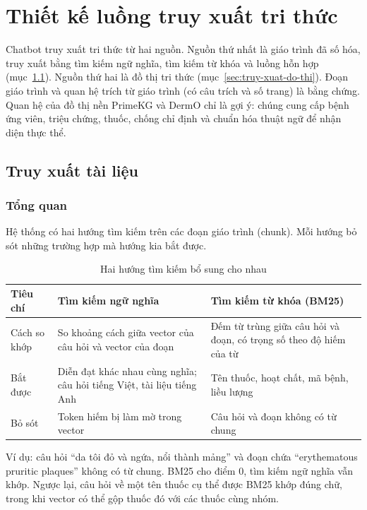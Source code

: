 \chapter[\MakeUppercase{Thiết kế luồng truy xuất tri thức}]{Thiết kế luồng truy xuất tri thức}
\label{ch:chuong3}

Chatbot truy xuất tri thức từ hai nguồn. Nguồn thứ nhất là giáo trình đã số hóa, truy xuất bằng tìm kiếm ngữ nghĩa, tìm kiếm từ khóa và luồng hỗn hợp (mục~\ref{sec:truy-xuat-tai-lieu}). Nguồn thứ hai là đồ thị tri thức (mục~\ref{sec:truy-xuat-do-thi}). Đoạn giáo trình và quan hệ trích từ giáo trình (có câu trích và số trang) là bằng chứng. Quan hệ của đồ thị nền PrimeKG và DermO chỉ là gợi ý: chúng cung cấp bệnh ứng viên, triệu chứng, thuốc, chống chỉ định và chuẩn hóa thuật ngữ để nhận diện thực thể.

\section{Truy xuất tài liệu}
\label{sec:truy-xuat-tai-lieu}

\subsection{Tổng quan}

Hệ thống có hai hướng tìm kiếm trên các đoạn giáo trình (chunk). Mỗi hướng bỏ sót những trường hợp mà hướng kia bắt được.

\begin{table}[H]
\centering
\small
\begin{tabular}{|p{3.2cm}|p{5.4cm}|p{5.4cm}|}
\hline
\textbf{Tiêu chí} & \textbf{Tìm kiếm ngữ nghĩa} & \textbf{Tìm kiếm từ khóa (BM25)} \\ \hline
Cách so khớp & So khoảng cách giữa vector của câu hỏi và vector của đoạn & Đếm từ trùng giữa câu hỏi và đoạn, có trọng số theo độ hiếm của từ \\ \hline
Bắt được & Diễn đạt khác nhau cùng nghĩa; câu hỏi tiếng Việt, tài liệu tiếng Anh & Tên thuốc, hoạt chất, mã bệnh, liều lượng \\ \hline
Bỏ sót & Token hiếm bị làm mờ trong vector & Câu hỏi và đoạn không có từ chung \\ \hline
\end{tabular}
\caption{Hai hướng tìm kiếm bổ sung cho nhau}
\label{tab:bu-dap}
\end{table}

Ví dụ: câu hỏi ``da tôi đỏ và ngứa, nổi thành mảng'' và đoạn chứa ``erythematous pruritic plaques'' không có từ chung. BM25 cho điểm $0$, tìm kiếm ngữ nghĩa vẫn khớp. Ngược lại, câu hỏi về một tên thuốc cụ thể được BM25 khớp đúng chữ, trong khi vector có thể gộp thuốc đó với các thuốc cùng nhóm.

